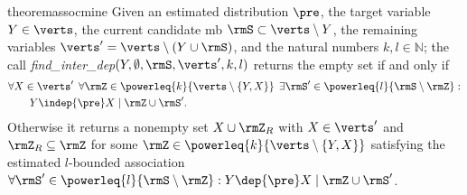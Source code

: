 \documentclass[accepted]{uai2026} %
\theoremstyle{plain}
\theoremstyle{definition}
\theoremstyle{remark}
\begin{document}
\begin{restatable}{theorem}{assocmine}
  \label{thm:assocmine}
  Given an estimated distribution $\pre$, the target variable
  $Y\in\verts$, the current candidate \gls{mb}
  $\rmS\subset\verts\setminus Y$, the remaining variables
  $\verts'=\verts\setminus(Y\cup \rmS)$, and the natural numbers
  $k,l\in\mathbb{N}$; the call
  \textit{find\_inter\_dep}$(Y,\emptyset,\rmS,\verts',k,l)$ returns the
  empty set if and only if
  \begin{equation}
    \label{eq:fid-empty}
    \begin{aligned}
      &\forall X \in \verts'\:\:
        \forall \rmZ \in \powerleq{k}{\verts\setminus\{Y,X\}}\:\:
        \exists \rmS' \in \powerleq{l}{\rmS\setminus\rmZ} :\\
      &\qquad Y \indep{\pre} X \mid \rmZ \cup \rmS'.
    \end{aligned}
  \end{equation}
  Otherwise it returns a nonempty set $X\cup\rmZ_{R}$ with
  $X\in\verts'$ and $\rmZ_{R}\subseteq\rmZ$ for some
  $\rmZ\in\powerleq{k}{\verts\setminus\{Y,X\}}$ satisfying the estimated
  $l$-bounded association
  $\forall\rmS'\in\powerleq{l}{\rmS\setminus\rmZ}:
  Y\dep{\pre}X\mid\rmZ\cup\rmS'$.
\end{restatable}



\begin{algorithm}[t]
  \caption{Practical Conditional Independence Test}\label{alg:ci-test}
\end{algorithm}
\end{document}
